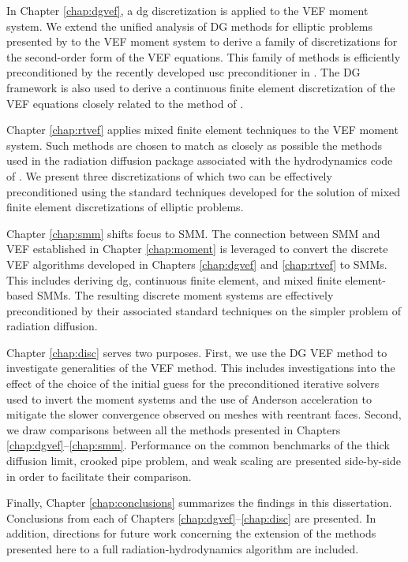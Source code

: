 \documentclass[../doc.tex]{subfiles}
\begin{document}
In Chapter \ref{chap:dgvef}, a \gls{dg} discretization is applied to the VEF moment system. We extend the unified analysis of DG methods for elliptic problems presented by \textcite{Arnold2002} to the VEF moment system to derive a family of discretizations for the second-order form of the VEF equations. This family of methods is efficiently preconditioned by the recently developed \gls{usc} preconditioner in \textcite{Pazner2021}. The DG framework is also used to derive a continuous finite element discretization of the VEF equations closely related to the method of \textcite{two-level-independent-warsa}. 

Chapter \ref{chap:rtvef} applies mixed finite element techniques to the VEF moment system. Such methods are chosen to match as closely as possible the methods used in the radiation diffusion package associated with the hydrodynamics code of \cite{blast}. We present three discretizations of which two can be effectively preconditioned using the standard techniques developed for the solution of mixed finite element discretizations of elliptic problems. 

Chapter \ref{chap:smm} shifts focus to SMM. The connection between SMM and VEF established in Chapter \ref{chap:moment} is leveraged to convert the discrete VEF algorithms developed in Chapters \ref{chap:dgvef} and \ref{chap:rtvef} to SMMs. This includes deriving \gls{dg}, continuous finite element, and mixed finite element-based SMMs. The resulting discrete moment systems are effectively preconditioned by their associated standard techniques on the simpler problem of radiation diffusion. 

Chapter \ref{chap:disc} serves two purposes. First, we use the DG VEF method to investigate generalities of the VEF method. This includes investigations into the effect of the choice of the initial guess for the preconditioned iterative solvers used to invert the moment systems and the use of Anderson acceleration to mitigate the slower convergence observed on meshes with reentrant faces. Second, we draw comparisons between all the methods presented in Chapters \ref{chap:dgvef}--\ref{chap:smm}. Performance on the common benchmarks of the thick diffusion limit, crooked pipe problem, and weak scaling are presented side-by-side in order to facilitate their comparison. 

Finally, Chapter \ref{chap:conclusions} summarizes the findings in this dissertation. Conclusions from each of Chapters \ref{chap:dgvef}--\ref{chap:disc} are presented. In addition, directions for future work concerning the extension of the methods presented here to a full radiation-hydrodynamics algorithm are included. 
\end{document}
